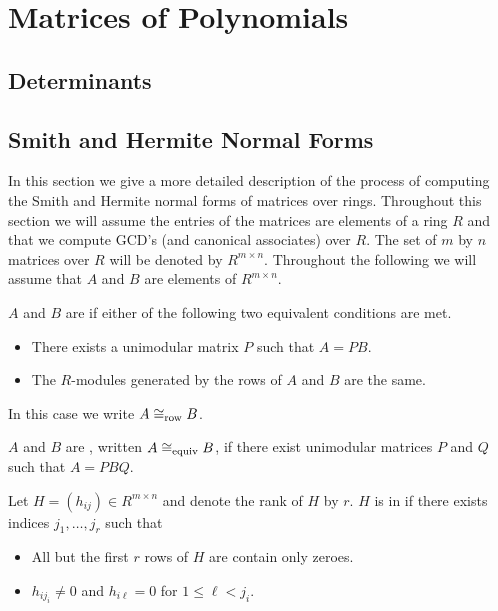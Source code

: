 \chapter{Matrices of Polynomials}
\label{Poly:Matrix:Chap}

\section{Determinants}
\label{PMat:Det:Sec}

\section{Smith and Hermite Normal Forms}
\label{PMat:Smith:Sec}

In this section we give a more detailed description of the process of
computing the Smith and Hermite normal forms of matrices over rings.
Throughout this section we will assume the entries of the matrices
are elements of a ring $R$ and that we compute GCD's (and canonical
associates) over $R$.  The set of $m$ by $n$ matrices over $R$ will be
denoted by $R^{m \times n}$.  Throughout the following we will assume
that $A$ and $B$ are elements of $R^{m \times n}$. 

\begin{definition}
$A$ and $B$ are  if either of the following two
equivalent conditions are met.
\begin{itemize} 
\item There exists a unimodular matrix $P$ such that $A = PB$.
\item The $R$-modules generated by the rows of $A$ and $B$ are the
same.
\end{itemize}
In this case we write $A \cong_{\rm row} B$.
\end{definition}

\begin{definition}
$A$ and $B$ are , written $A \cong_{\rm equiv} B$, if there
exist unimodular matrices $P$ and $Q$ such that $A = PBQ$.
\end{definition}

\begin{definition}
Let $H =(h_{ij}) \in R^{m \times n}$ and denote the rank of $H$ by
$r$.  $H$ is in  if there exists indices $j_1,
\ldots, j_r$ such that
\begin{itemize}
\item All but the first $r$ rows of $H$ are contain only zeroes.
\item $h_{ij_i} \not= 0$ and $h_{i\ell} = 0$ for $1 \le \ell < j_i$.
\end{itemize}
\end{definition}

